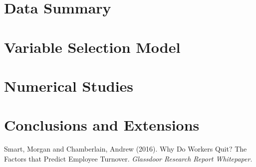 \documentclass{amsart}[12pt]
\begin{document}
\section{Data Summary} 


\section{Variable Selection Model} 

\section{Numerical Studies} 

\section{Conclusions and Extensions} 



\begin{thebibliography}{100}
     Smart, Morgan and Chamberlain, Andrew (2016). Why Do Workers Quit? The Factors 
        that Predict Employee Turnover. \emph{Glassdoor Research Report Whitepaper}.  
\end{thebibliography}
\end{document}

